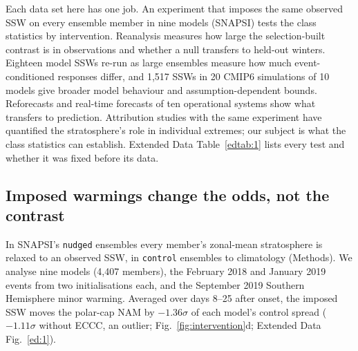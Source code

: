 \documentclass[11pt]{article}
\begin{document}
Each data set here has one job. An experiment that imposes the same observed SSW on every ensemble member in nine models (SNAPSI\cite{hitchcock22}) tests the class statistics by intervention. Reanalysis measures how large the selection-built contrast is in observations and whether a null transfers to held-out winters. Eighteen model SSWs re-run as large ensembles\cite{loeffel26} measure how much event-conditioned responses differ, and 1,517 SSWs in 20 CMIP6 simulations of 10 models give broader model behaviour and assumption-dependent bounds. Reforecasts and real-time forecasts of ten operational systems show what transfers to prediction. Attribution studies with the same experiment have quantified the stratosphere's role in individual extremes\cite{seviour26}; our subject is what the class statistics can establish. Extended Data Table~\ref{edtab:1} lists every test and whether it was fixed before its data.

\subsection*{Imposed warmings change the odds, not the contrast}

In SNAPSI's \texttt{nudged} ensembles every member's zonal-mean stratosphere is relaxed to an observed SSW, in \texttt{control} ensembles to climatology (Methods). We analyse nine models (4,407 members), the February 2018 and January 2019 events from two initialisations each, and the September 2019 Southern Hemisphere minor warming. Averaged over days 8--25 after onset, the imposed SSW moves the polar-cap NAM by $-1.36\sigma$ of each model's control spread ($-1.11\sigma$ without ECCC, an outlier; Fig.~\ref{fig:intervention}d; Extended Data Fig.~\ref{ed:1}).
\end{document}
